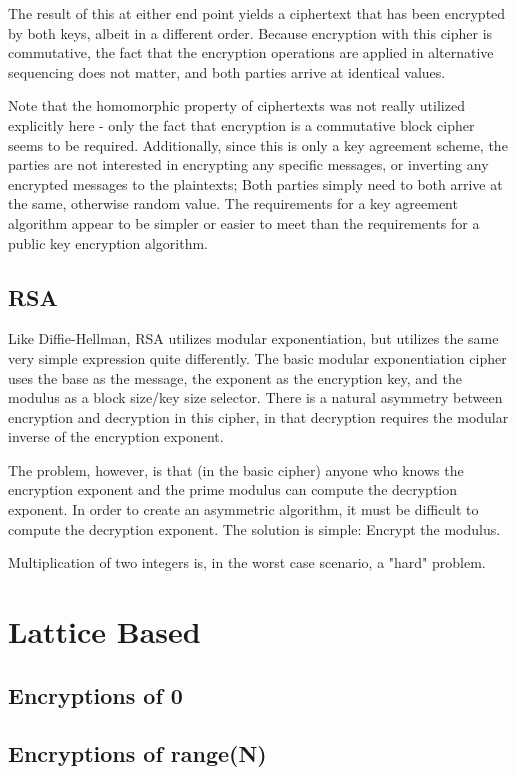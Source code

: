 \documentclass[preprint]{iacrtrans}
\begin{document}
The result of this at either end point yields a ciphertext that has been encrypted by both keys, albeit in a different order. Because encryption with this cipher is commutative, the fact that the encryption operations are applied in alternative sequencing does not matter, and both parties arrive at identical values.

Note that the homomorphic property of ciphertexts was not really utilized explicitly here - only the fact that encryption is a commutative block cipher seems to be required. Additionally, since this is only a key agreement scheme, the parties are not interested in encrypting any specific messages, or inverting any encrypted messages to the plaintexts; Both parties simply need to both arrive at the same, otherwise random value. The requirements for a key agreement algorithm appear to be simpler or easier to meet than the requirements for a public key encryption algorithm.

\subsection{RSA}
Like Diffie-Hellman, RSA utilizes modular exponentiation, but utilizes the same very simple expression quite differently. The basic modular exponentiation cipher uses the base as the message, the exponent as the encryption key, and the modulus as a block size/key size selector. There is a natural asymmetry between encryption and decryption in this cipher, in that decryption requires the modular inverse of the encryption exponent. 

The problem, however, is that (in the basic cipher) anyone who knows the encryption exponent and the prime modulus can compute the decryption exponent. In order to create an asymmetric algorithm, it must be difficult to compute the decryption exponent. The solution is simple: Encrypt the modulus.

Multiplication of two integers is, in the worst case scenario, a "hard" problem. 

\section{Lattice Based}
\subsection{Encryptions of 0}
\subsection{Encryptions of range(N)}
\end{document}
